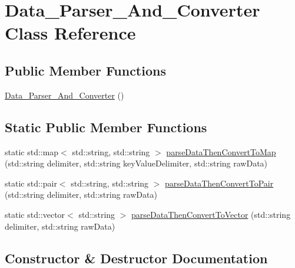 \hypertarget{class_data___parser___and___converter}{}\section{Data\+\_\+\+Parser\+\_\+\+And\+\_\+\+Converter Class Reference}
\label{class_data___parser___and___converter}
\subsection*{Public Member Functions}
\begin{DoxyCompactItemize}
\item 
\mbox{\hyperlink{class_data___parser___and___converter_a6be39bded0dc784a018cca7228c5a400}{Data\+\_\+\+Parser\+\_\+\+And\+\_\+\+Converter}} ()
\end{DoxyCompactItemize}
\subsection*{Static Public Member Functions}
\begin{DoxyCompactItemize}
\item 
static std\+::map$<$ std\+::string, std\+::string $>$ \mbox{\hyperlink{class_data___parser___and___converter_a42e1a74db4715d980b83f42d103c25e2}{parse\+Data\+Then\+Convert\+To\+Map}} (std\+::string delimiter, std\+::string key\+Value\+Delimiter, std\+::string raw\+Data)
\item 
static std\+::pair$<$ std\+::string, std\+::string $>$ \mbox{\hyperlink{class_data___parser___and___converter_af44ead8fe2769d136227e3f603d14f70}{parse\+Data\+Then\+Convert\+To\+Pair}} (std\+::string delimiter, std\+::string raw\+Data)
\item 
static std\+::vector$<$ std\+::string $>$ \mbox{\hyperlink{class_data___parser___and___converter_aba2bbb38e79306b1da28ec1042e2b888}{parse\+Data\+Then\+Convert\+To\+Vector}} (std\+::string delimiter, std\+::string raw\+Data)
\end{DoxyCompactItemize}


\subsection{Constructor \& Destructor Documentation}
\mbox{\label{class_data___parser___and___converter_a6be39bded0dc784a018cca7228c5a400}} 

